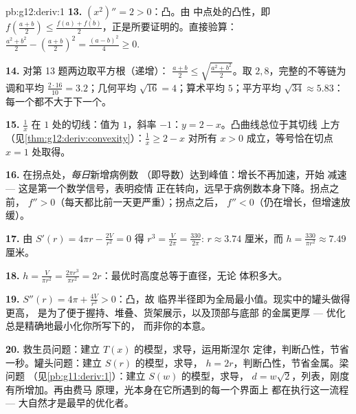 \begin{solution}{pb:g12:deriv:1}
\textbf{13.} $(x^2)'' = 2 > 0$：凸。由
中点处的凸性，即 $f\left(\frac{a+b}{2}\right) \leq
\frac{f(a) + f(b)}{2}$，正是所要证明的。直接验算：
$\frac{a^2 + b^2}{2} - \left(\frac{a+b}{2}\right)^2 =
\frac{(a - b)^2}{4} \geq 0$.

\textbf{14.} 对第 13 题两边取平方根（递增）：
$\frac{a + b}{2} \leq \sqrt{\frac{a^2 + b^2}{2}}$。取 $2, 8$，完整的不等链为
调和平均 $\frac{2 \cdot 16}{10} = 3.2$；几何平均
$\sqrt{16} = 4$；算术平均 $5$；平方平均
$\sqrt{34} \approx 5.83$：每一个都不大于下一个。

\textbf{15.} $\frac1x$ 在 $1$ 处的切线：值为 $1$，斜率
$-1$：$y = 2 - x$。凸曲线总位于其切线
上方（见\cref{thm:g12:deriv:convexity}）：$\frac1x \geq 2 - x$ 对所有
$x > 0$ 成立，等号恰在切点 $x = 1$ 处取得。

\textbf{16.} 在拐点处，\emph{每日}新增病例数
（即导数）达到峰值：增长不再加速，开始
减速 --- 这是第一个数学信号，表明疫情
正在转向，远早于病例数本身下降。拐点之前，
$f'' > 0$（每天都比前一天更严重）；拐点之后，
$f'' < 0$（仍在增长，但增速放缓）。

\textbf{17.} 由 $S'(r) = 4\pi r - \frac{2V}{r^2} = 0$ 得
$r^3 = \frac{V}{2\pi} = \frac{330}{2\pi}$:
$r \approx 3.74$ 厘米，而
$h = \frac{330}{\pi r^2} \approx 7.49$ 厘米。

\textbf{18.} $h = \frac{V}{\pi r^2} = \frac{2\pi r^3}{\pi r^2}
= 2r$：最优时高度总等于直径，无论
体积多大。

\textbf{19.} $S''(r) = 4\pi + \frac{4V}{r^3} > 0$：凸，故
临界半径即为全局最小值。现实中的罐头做得更高，
是为了便于握持、堆叠、货架展示，以及顶部与底部
的金属更厚 --- 优化总是精确地最小化你所写下的，
而非你的本意。

\textbf{20.} 救生员问题：建立 $T(x)$ 的模型，求导，运用斯涅尔
定律，判断凸性，节省一秒。罐头问题：建立 $S(r)$ 的模型，求导，
$h = 2r$，判断凸性，节省金属。梁问题
（见\cref{pb:g11:deriv:1}）：建立 $S(w)$ 的模型，求导，
$d = w\sqrt2$，列表，刚度有所增加。再由费马
原理，光本身在它所遇到的每一个界面上
都在执行这一流程 --- 大自然才是最早的优化者。
\end{solution}
